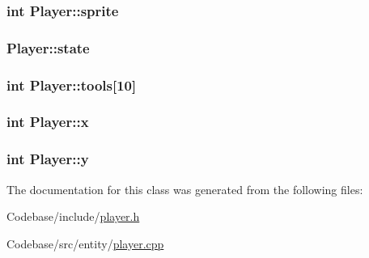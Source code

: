 \hypertarget{class_player_aac9bac60b3b27c77a1970f7e7999f5d5}{
\subsubsection[{sprite}]{\setlength{\rightskip}{0pt plus 5cm}int {\bf Player\-::sprite}}}\label{class_player_aac9bac60b3b27c77a1970f7e7999f5d5}
\hypertarget{class_player_afb60fdad921bce05783ef2709e849c27}{
\subsubsection[{state}]{ {\bf Player\-::state}}}\label{class_player_afb60fdad921bce05783ef2709e849c27}
\hypertarget{class_player_aee04f54f61b45e5912b48fb9203cad38}{
\subsubsection[{tools}]{\setlength{\rightskip}{0pt plus 5cm}int {\bf Player\-::tools}\mbox{[}10\mbox{]}}}\label{class_player_aee04f54f61b45e5912b48fb9203cad38}
\hypertarget{class_player_ad285b3cb25e4a46ca944b9a416c1b13f}{
\subsubsection[{x}]{\setlength{\rightskip}{0pt plus 5cm}int {\bf Player\-::x}}}\label{class_player_ad285b3cb25e4a46ca944b9a416c1b13f}
\hypertarget{class_player_a6da29d6e3783c6028c92647bbde478f5}{
\subsubsection[{y}]{\setlength{\rightskip}{0pt plus 5cm}int {\bf Player\-::y}}}\label{class_player_a6da29d6e3783c6028c92647bbde478f5}


The documentation for this class was generated from the following files\-:\begin{DoxyCompactItemize}
\item 
Codebase/include/\hyperlink{player_8h}{player.\-h}\item 
Codebase/src/entity/\hyperlink{player_8cpp}{player.\-cpp}\end{DoxyCompactItemize}
